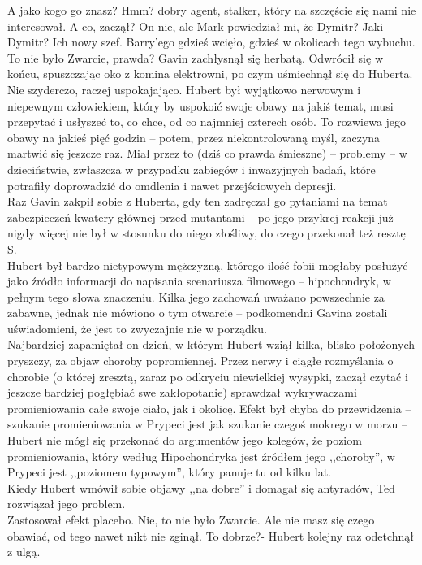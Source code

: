 \documentclass[../MAIN.tex]{subfiles}
\begin{document}
\xx A jako kogo go znasz?
\xx Hmm? dobry agent, stalker, który na szczęście się nami nie interesował. A co, zaczął?
\xx On nie, ale Mark powiedział mi, że Dymitr?
\xx Jaki Dymitr?
\xx Ich nowy szef. Barry'ego gdzieś wcięło, gdzieś w okolicach tego wybuchu. To nie było Zwarcie, prawda?
\qd
Gavin zachłysnął się herbatą. Odwrócił się w końcu, spuszczając oko z komina elektrowni, po czym uśmiechnął się do Huberta. Nie szyderczo, raczej uspokajająco. Hubert był wyjątkowo nerwowym i niepewnym człowiekiem, który by uspokoić swoje obawy na jakiś temat, musi przepytać i usłyszeć to, co chce, od co najmniej czterech osób. To rozwiewa jego obawy na jakieś pięć godzin -- potem, przez niekontrolowaną myśl, zaczyna martwić się jeszcze raz. Miał przez to (dziś co prawda śmieszne) -- problemy -- w dzieciństwie, zwłaszcza w przypadku zabiegów i inwazyjnych badań, które potrafiły doprowadzić do omdlenia i nawet przejściowych depresji.\\
Raz Gavin zakpił sobie z Huberta, gdy ten zadręczał go pytaniami na temat zabezpieczeń kwatery głównej przed mutantami -- po jego przykrej reakcji już nigdy więcej nie był w stosunku do niego złośliwy, do czego przekonał też resztę S.\\
Hubert był bardzo nietypowym mężczyzną, którego ilość fobii mogłaby posłużyć jako źródło informacji do napisania scenariusza filmowego -- hipochondryk, w pełnym tego słowa znaczeniu. Kilka jego zachowań uważano powszechnie za zabawne, jednak nie mówiono o tym otwarcie -- podkomendni Gavina zostali uświadomieni, że jest to zwyczajnie nie w porządku.\\
Najbardziej zapamiętał on dzień, w którym Hubert wziął kilka, blisko położonych pryszczy, za objaw choroby popromiennej. Przez nerwy i ciągłe rozmyślania o chorobie (o której zresztą, zaraz po odkryciu niewielkiej wysypki, zaczął czytać i jeszcze bardziej pogłębiać swe zakłopotanie) sprawdzał wykrywaczami promieniowania całe swoje ciało, jak i okolicę. Efekt był chyba do przewidzenia -- szukanie promieniowania w Prypeci jest jak szukanie czegoś mokrego w morzu -- Hubert nie mógł się przekonać do argumentów jego kolegów, że poziom promieniowania, który według Hipochondryka jest źródłem jego ,,choroby'', w Prypeci jest ,,poziomem typowym'', który panuje tu od kilku lat.\\
Kiedy Hubert wmówił sobie objawy ,,na dobre'' i domagał się antyradów, Ted rozwiązał jego problem.\\
Zastosował efekt placebo.
\sx Nie, to nie było Zwarcie. Ale nie masz się czego obawiać, od tego nawet nikt nie zginął.
\xx To dobrze?- Hubert kolejny raz odetchnął z ulgą.
\qd
\end{document}

